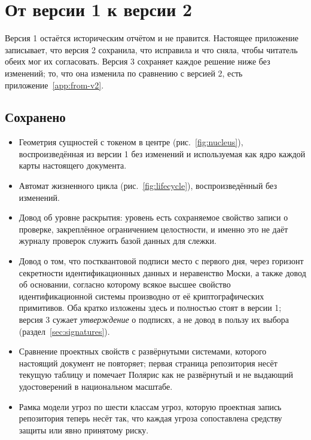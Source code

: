 \section{От версии 1 к версии 2}
\label{app:from-v1}

Версия 1 остаётся историческим отчётом и не правится. Настоящее приложение записывает, что
версия 2 сохранила, что исправила и что сняла, чтобы читатель обеих мог их согласовать. Версия 3
сохраняет каждое решение ниже без изменений; то, что она изменила по сравнению с версией 2, есть
приложение~\ref{app:from-v2}.

\subsection*{Сохранено}

\begin{itemize}
  \item Геометрия сущностей с токеном в центре (рис.~\ref{fig:nucleus}), воспроизведённая из
    версии 1 без изменений и используемая как ядро каждой карты настоящего документа.
  \item Автомат жизненного цикла (рис.~\ref{fig:lifecycle}), воспроизведённый без изменений.
  \item Довод об уровне раскрытия: уровень есть сохраняемое свойство записи о проверке,
    закреплённое ограничением целостности, и именно это не даёт журналу проверок служить базой
    данных для слежки.
  \item Довод о том, что постквантовой подписи место с первого дня, через горизонт секретности
    идентификационных данных и неравенство Моски, а также довод об основании, согласно которому
    всякое высшее свойство идентификационной системы производно от её криптографических
    примитивов. Оба кратко изложены здесь и полностью стоят в версии 1; версия 3 сужает
    \emph{утверждение} о подписях, а не довод в пользу их выбора (раздел~\ref{sec:signatures}).
  \item Сравнение проектных свойств с развёрнутыми системами, которого настоящий документ не
    повторяет; первая страница репозитория несёт текущую таблицу и помечает Полярис как не
    развёрнутый и не выдающий удостоверений в национальном масштабе.
  \item Рамка модели угроз по шести классам угроз, которую проектная запись репозитория теперь
    несёт так, что каждая угроза сопоставлена средству защиты или явно принятому риску.
\end{itemize}

